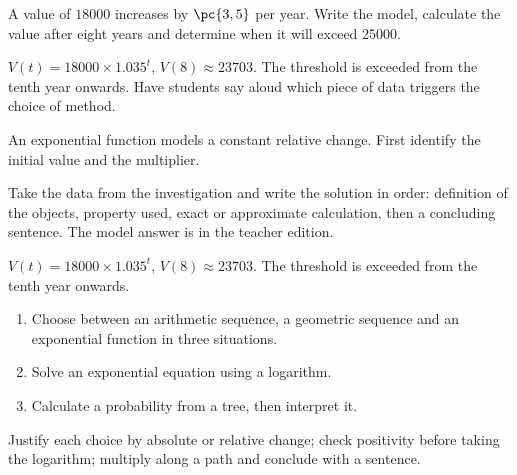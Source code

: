 \begin{activity}
A value of $\num{18000}$ increases by $\pc{3,5}$ per year. Write the model, calculate the value after eight years and determine when it will exceed $\num{25000}$.
\begin{center}\end{center}
\end{activity}
\begin{solution}$V(t)=\num{18000}\times\num{1,035}^t$, $V(8)\approx\num{23703}$. The threshold is exceeded from the tenth year onwards. Have students say aloud which piece of data triggers the choice of method.\end{solution}

\begin{summary}An exponential function models a constant relative change. First identify the initial value and the multiplier.\end{summary}

\begin{example}
Take the data from the investigation and write the solution in order: definition of the objects, property used, exact or approximate calculation, then a concluding sentence. The model answer is in the teacher edition.
\end{example}
\begin{solution}$V(t)=\num{18000}\times\num{1,035}^t$, $V(8)\approx\num{23703}$. The threshold is exceeded from the tenth year onwards.\end{solution}

\begin{exercise}[essential]
\begin{enumerate}\item Choose between an arithmetic sequence, a geometric sequence and an exponential function in three situations.\item Solve an exponential equation using a logarithm.\item Calculate a probability from a tree, then interpret it.\end{enumerate}
\end{exercise}
\begin{solution}Justify each choice by absolute or relative change; check positivity before taking the logarithm; multiply along a path and conclude with a sentence.\end{solution}

